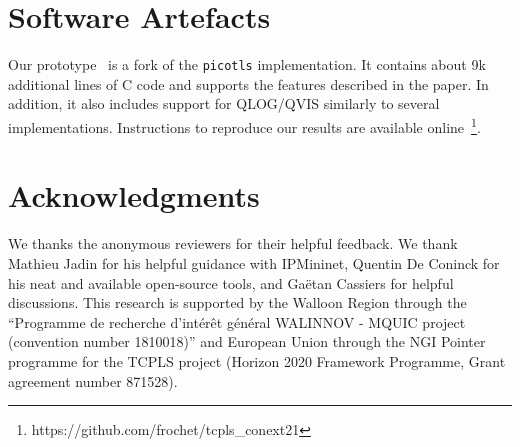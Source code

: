 %


\section*{Software Artefacts}

Our \tcpls prototype~\cite{frochet-github-picotcpls} is a fork of the
\texttt{picotls}  implementation.  It contains about 9k additional lines
of C code and supports the features described in the paper. In addition, it also
includes support for QLOG/QVIS \cite{marx2020debugging} similarly to several
\quic implementations. Instructions to reproduce our results are
available online~\footnote{https://github.com/frochet/tcpls\_conext21}.


\section*{Acknowledgments}

We thanks the anonymous reviewers for their helpful feedback. We thank Mathieu
Jadin for his helpful guidance with IPMininet, Quentin De Coninck for his neat
and available open-source tools, and Gaëtan Cassiers for helpful discussions.
This research is supported by the Walloon Region through the ``Programme de
recherche d'intérêt général WALINNOV - MQUIC project (convention number
1810018)'' and European Union through the NGI Pointer programme for the TCPLS
project (Horizon 2020 Framework Programme, Grant agreement number 871528).

